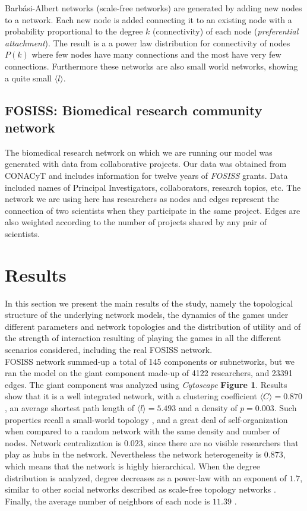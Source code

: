\documentclass[11pt]{article}
\begin{document}
Barb\'asi-Albert networks \cite{Barabasi1999} (scale-free networks) are generated by adding new nodes to a network. Each new node is added connecting it to an existing node with a probability proportional to the degree $k$ (connectivity) of each node (\textit{preferential attachment}). The result is a a power law distribution for connectivity of nodes $P(k)$ where few nodes have many connections and the most have very few connections. Furthermore these networks are also small world networks, showing a quite small $\langle l \rangle$.


\subsection{FOSISS: Biomedical research community network}

The biomedical research network on which we are running our model was generated 
with data from collaborative projects. Our data was obtained from CONACyT and includes information for twelve years of \textit{FOSISS} grants. Data included names of Principal Investigators, collaborators, research topics, etc. The network we are using here has researchers as nodes and edges represent the connection of two scientists when they participate in the same project. Edges are also weighted according to the number of projects shared by any pair of scientists.\\


\section{Results}
\label{sec:3}

In this section we present the main results of the study, namely the topological
structure of the underlying network models, the dynamics of the games under
different parameters and network topologies and the distribution of utility and
of the strength of interaction resulting of playing the games in all the
different scenarios considered, including the real FOSISS network.\\


FOSISS network summed-up a total of 145 components or subnetworks, but we ran
the model on the giant component made-up of 4122 researchers, and 23391 edges.
The giant component was analyzed using \textit{Cytoscape} \textbf{Figure
  1}. Results show that it is a well integrated network, with a clustering
coefficient $\langle C \rangle = 0.870$, an average shortest path length of
$\langle l \rangle = 5.493$  and a density of $p = 0.003$. Such properties
recall a small-world topology \cite{Watts1998}, and a great deal of
self-organization when compared to a random network with the same density and
number of nodes. Network centralization is $0.023$, since there are no visible
researchers that play as hubs in the network. Nevertheless the network
heterogeneity is $0.873$, which means that the network is highly
hierarchical. When the degree distribution is analyzed, degree decreases as a
power-law with an exponent of $1.7$, similar to other social networks described
as scale-free topology networks \cite{Barabasi1999}. Finally, the average number
of neighbors of each node is $11.39$ \cite{Shannon2003}.\\
\end{document}
